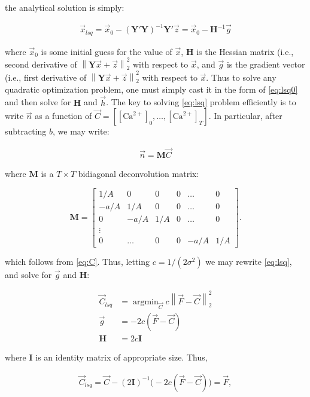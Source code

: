 \documentclass[12pt]{article}
\providecommand{\ve}[1]{\vec{#1}}
\providecommand{\ma}[1]{\boldsymbol{#1}}
\providecommand{\norm}[1]{\left \lVert#1 \right  \rVert}
\providecommand{\ve}[1]{\boldsymbol{#1}}
\DeclareMathOperator*{\argmin}{argmin}
\newcommand{\Ca}{[\text{Ca}^{2+}]}
\newcommand{\Cav}{\ve{C}}%
\begin{document}
\noindent the analytical solution is simply:

\begin{align}
\ve{x}_{lsq} = \ve{x}_0 - (\ma{Y}'\ma{Y})^{-1} \ma{Y}'\ve{z} 
= \ve{x}_0-\ma{H}^{-1}\ve{g}
\end{align}

\noindent where $\ve{x}_0$ is some initial guess for the value of $\ve{x}$, $\ma{H}$ is the Hessian matrix (i.e., second derivative of $\norm{\ma{Y} \ve{x} + \ve{z}}_2^2$ with respect to $\ve{x}$, and $\ve{g}$ is the gradient vector (i.e., first  derivative of $\norm{\ma{Y} \ve{x} + \ve{z}}_2^2$ with respect to $\ve{x}$. Thus to solve any quadratic optimization problem, one must simply cast it in the form of \eqref{eq:lsq0} and then solve for $\ma{H}$ and $\ve{h}$. The key to solving \eqref{eq:lsq} problem efficiently is to write $\ve{n}$ as a function of $\Cav=[\Ca_0,\ldots,\Ca_T]$. In particular, after subtracting $b$, we may write:

\begin{align} \label{eq:nMC}
\ve{n}=\ma{M}\Cav
\end{align}

\noindent where $\ma{M}$ is a $T \times T$ bidiagonal deconvolution matrix:

\begin{equation} \label{eq:M}
\ma{M}=\begin{bmatrix}
1/A&0&0&0&\ldots&0\\
-a/A&1/A&0&0&\ldots&0\\
0&-a/A&1/A&0&\ldots&0\\
\vdots\\
0&\ldots&0&0&-a/A&1/A
\end{bmatrix}.
\end{equation}

\noindent which follows from \eqref{eq:C}. Thus, letting $c=1/(2\sigma^2)$ we may rewrite \eqref{eq:lsq}, and solve for $\ve{g}$ and $\ma{H}$:

\begin{align}
\Cav_{lsq} &= \argmin_{\Cav} c\norm{\ve{F}-\Cav}_2^2\\
\ve{g} &= -2c(\ve{F}-\Cav)\\
\ma{H}&= 2c\ma{I}
\end{align}

\noindent where $\ma{I}$ is an identity matrix of appropriate size.  Thus,

\begin{align}
\Cav_{lsq} = \Cav-(2\ma{I})^{-1} \big(-2c(\ve{F}-\Cav)\big)=\ve{F},
\end{align}
\end{document}
